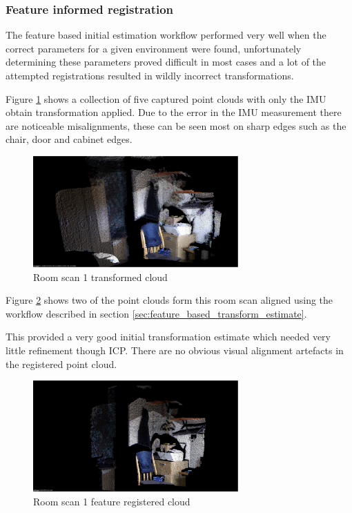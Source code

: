 \documentclass{entcs}
\begin{document}
\subsubsection{Feature informed registration}
\label{sec:feature_informed_registration}

The feature based initial estimation workflow performed very well when the
correct parameters for a given environment were found, unfortunately
determining these parameters proved difficult in most cases and a lot of the
attempted registrations resulted in wildly incorrect transformations.

Figure \ref{fig:room_1_transformed} shows a collection of five captured point
clouds with only the IMU obtain transformation applied. Due to the error in the
IMU measurement there are noticeable misalignments, these can be seen most on
sharp edges such as the chair, door and cabinet edges.

\begin{figure}[h!]
  \centering
  \includegraphics[width=0.7\textwidth]{graphics/room_1_transformed.eps}
  \caption{Room scan 1 transformed cloud}
  \label{fig:room_1_transformed}
\end{figure}

Figure \ref{fig:room_1_feature} shows two of the point clouds form this room
scan aligned using the workflow described in section
\ref{sec:feature_based_transform_estimate}.

This provided a very good initial transformation estimate which needed very
little refinement though ICP. There are no obvious visual alignment artefacts in
the registered point cloud.

\begin{figure}[h!]
  \centering
  \includegraphics[width=0.7\textwidth]{graphics/room_1_feature.eps}
  \caption{Room scan 1 feature registered cloud}
  \label{fig:room_1_feature}
\end{figure}
\end{document}
